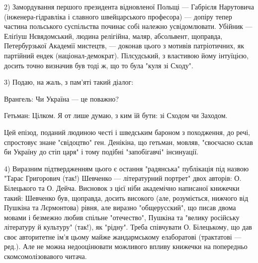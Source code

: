 2) Замордування першого президента відновленої Польщі — Габрієля Нарутовича (інженера-гідравліка і славного швейцарського професора) — допіру тепер частина польського суспільства починає собі належно усвідомлювати. Убійник — Еліґіуш Нєвядомський, людина релігійна, маляр, абсольвент, щоправда, Петербурзької Академії мистецтв, — доконав цього з мотивів патріотичних, як партійний ендек (націонал-демократ). Пілсудський, з властивою йому інтуїцією, досить точно визначив був тоді ж, що то була "куля зі Сходу".

3) Подаю, на жаль, з пам'яті такий діалог:

Врангель: Чи Україна — це поважно?

Гетьман: Цілком. Я от лише думаю, з ким їй бути: зі Сходом чи Заходом.

Цей епізод, поданий людиною честі і шведським бароном з походження, до речі, спростовує знане "свідоцтво" ген. Денікіна, що гетьман, мовляв, "своєчасно склав би Україну до стіп царя" і тому подібні "запобігавчі" інсинуації.

4) Виразним підтвердженням цього є остання "радянська" публікація під назвою "Тарас Григорович (так!) Шевченко — літературний портрет" двох авторів: О. Білецького та О. Дейча. Висновок з цієї ніби академічно написаної книжечки такий: Шевченко був, щоправда, досить високого (але, розуміється, нижчого від Пушкіна та Лєрмонтова) рівня, але виразно "общерусский", що писав двома мовами і безмежно любив спільне "отечество", Пушкіна та "велику російську літературу й культуру" (так!), як "рідну". Треба співчувати О. Білецькому, що дав своє авторитетне ім'я цьому майже жандармському елаборатові (трактатові — ред.). Але не можна недооцінювати можливого впливу книжечки на попередньо скомсомолізовавого читача.

